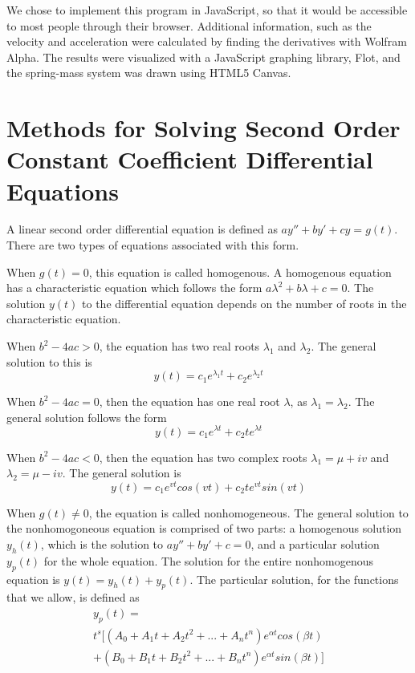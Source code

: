\documentclass[11pt]{article} %
\begin{document}
\begin{multicols}{2}
We chose to implement this program in JavaScript, so that it would be accessible to most people through their browser. Additional information, such as the velocity and acceleration were calculated by finding the derivatives with Wolfram Alpha. The results were visualized with a JavaScript graphing library, Flot, and the spring-mass system was drawn using HTML5 Canvas.

\section {Methods for Solving Second Order Constant Coefficient Differential Equations}

A linear second order differential equation is defined as $ay'' + by' + cy = g(t)$. There are two types of equations associated with this form.

When $g(t) = 0$, this equation is called homogenous. A homogenous equation has a characteristic equation which follows the form $a\lambda^2 + b\lambda + c = 0$. The solution $y(t)$ to the differential equation depends on the number of roots in the characteristic equation.

When $b^2 - 4ac > 0$, the equation has two real roots $\lambda_1$ and $\lambda_2$. The general solution to this is
\begin{equation}\label{eq:underdamped}
y(t) = c_1e^{\lambda_1t} + c_2e^{\lambda_2t}
\end{equation}

When $b^2 - 4ac = 0$, then the equation has one real root $\lambda$, as $\lambda_1 = \lambda_2$. The general solution follows the form
\begin{equation}\label{eq:critically_damped}
y(t) = c_1e^{{\lambda}t} + c_2te^{{\lambda}t}
\end{equation}

When $b^2 - 4ac < 0$, then the equation has two complex roots $\lambda_1 = \mu + iv$ and $\lambda_2 = \mu - iv$. The general solution is 
\begin{equation}\label{eq:overdamped}
y(t) = c_1e^{vt}cos(vt) + c_2te^{vt}sin(vt)
\end{equation}

When $g(t) \neq 0$, the equation is called nonhomogeneous. The general solution to the nonhomogoneous equation is comprised of two parts: a homogenous solution $y_h(t)$, which is the solution to $ay'' + by' + c = 0$, and a particular solution $y_p(t)$ for the whole equation. The solution for the entire nonhomogenous equation is $y(t) = y_h(t) + y_p(t)$. The particular solution, for the functions that we allow, is defined as
\begin{equation}\label{eq:generalized}
\begin{split}
y_p(t)=\\t^s[(A_0 + A_1t + A_2t^2 + ... + A_nt^n)e^{{\alpha}t}cos({\beta}t)\\+ (B_0 + B_1t + B_2t^2 + ... + B_nt^n)e^{{\alpha}t}sin({\beta}t)]
\end{split}
\end{equation}


\end{multicols}
\end{document}
